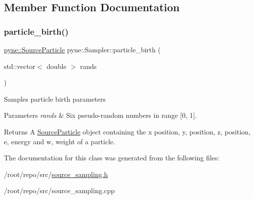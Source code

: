 \subsection{Member Function Documentation}
\mbox{\label{classpyne_1_1_sampler_a2e5d98ef0f98a3093c32936ce6cc8cd2}} 
\subsubsection{\texorpdfstring{particle\+\_\+birth()}{particle\_birth()}}
{\footnotesize\ttfamily \hyperlink{classpyne_1_1_source_particle}{pyne\+::\+Source\+Particle} pyne\+::\+Sampler\+::particle\+\_\+birth (\begin{DoxyParamCaption}\item[{std\+::vector$<$ double $>$}]{rands }\end{DoxyParamCaption})}

Samples particle birth parameters 
\begin{DoxyParams}{Parameters}
{\em rands} & Six pseudo-\/random numbers in range \mbox{[}0, 1\mbox{]}. \\
\hline
\end{DoxyParams}
\begin{DoxyReturn}{Returns}
A \hyperlink{classpyne_1_1_source_particle}{Source\+Particle} object containing the x position, y, position, z, position, e, energy and w, weight of a particle. 
\end{DoxyReturn}


The documentation for this class was generated from the following files\+:\begin{DoxyCompactItemize}
\item 
/root/repo/src/\hyperlink{source__sampling_8h}{source\+\_\+sampling.\+h}\item 
/root/repo/src/source\+\_\+sampling.\+cpp\end{DoxyCompactItemize}

